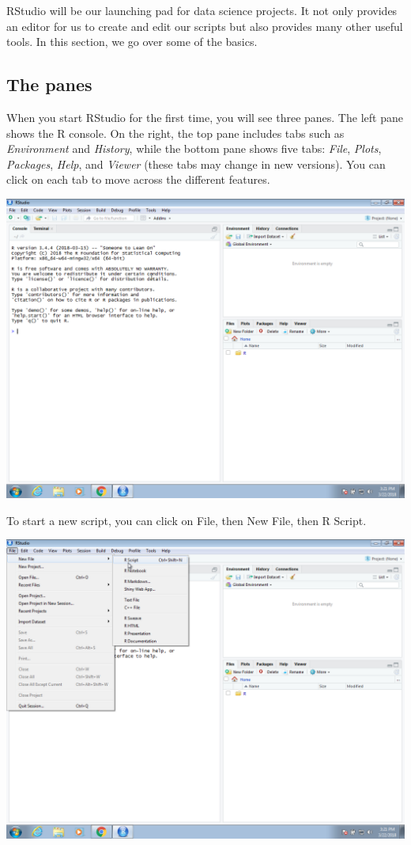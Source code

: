 \documentclass[
]{krantz}
\begin{document}
RStudio will be our launching pad for data science projects. It not only provides an editor for us to create and edit our scripts but also provides many other useful tools. In this section, we go over some of the basics.

\hypertarget{the-panes}{%
\subsection{The panes}\label{the-panes}}

When you start RStudio for the first time, you will see three panes. The left pane shows the R console. On the right, the top pane includes tabs such as \emph{Environment} and \emph{History}, while the bottom pane shows five tabs: \emph{File}, \emph{Plots}, \emph{Packages}, \emph{Help}, and \emph{Viewer} (these tabs may change in new versions). You can click on each tab to move across the different features.

\begin{center}\includegraphics[width=0.7\linewidth]{productivity/img/windows-screenshots/VirtualBox_Windows-7-Enterprise_22_03_2018_16_21_16} \end{center}

To start a new script, you can click on File, then New File, then R Script.

\begin{center}\includegraphics[width=0.7\linewidth]{productivity/img/windows-screenshots/VirtualBox_Windows-7-Enterprise_22_03_2018_16_21_42} \end{center}
\end{document}
